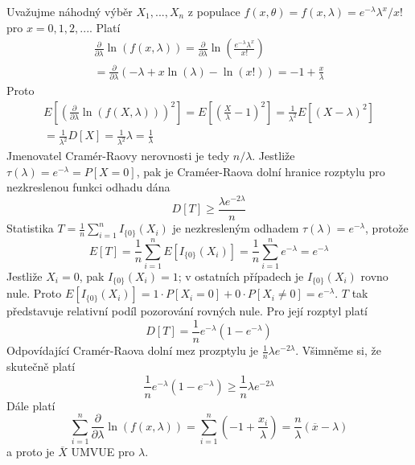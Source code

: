 \begin{example}
Uvažujme náhodný výběr $X_1, ..., X_n$ z populace $f(x, \theta) = f(x, \lambda) = e^{-\lambda}\lambda^x / x!$ pro $x = 0, 1, 2, ...$. Platí
\begin{gather*}
\frac{\partial}{\partial \lambda} \ln \left(f(x, \lambda)\right) = \frac{\partial}{\partial \lambda} \ln \left(\frac{e^{-\lambda}\lambda^x}{x!}\right)\\
= \frac{\partial}{\partial \lambda}(-\lambda + x \ln(\lambda) - \ln(x!)) = -1 + \frac{x}{\lambda} 
\end{gather*}
Proto
\begin{gather*}
E\left[\left(\frac{\partial}{\partial \lambda} \ln\left(f(X, \lambda)\right)\right)^2\right] = E\left[\left(\frac{X}{\lambda} - 1\right)^2\right] = \frac{1}{\lambda^2}E[(X - \lambda)^2]\\
= \frac{1}{\lambda^2}D[X] = \frac{1}{\lambda^2}{\lambda} = \frac{1}{\lambda}
\end{gather*}
Jmenovatel Cramér-Raovy nerovnosti je tedy $n/\lambda$. Jestliže $\tau(\lambda) = e^{-\lambda} = P[X = 0]$, pak je Craméer-Raova dolní hranice rozptylu pro nezkreslenou funkci odhadu dána
\begin{equation*}
D[T] \ge \frac{\lambda e^{-2 \lambda}}{n}
\end{equation*}
Statistika $T = \frac{1}{n}\sum_{i = 1}^n I_{\{0\}}(X_i)$ je nezkresleným odhadem $\tau(\lambda) = e^{-\lambda}$, protože 
\begin{equation*}
E[T] = \frac{1}{n}\sum_{i = 1}^n E[I_{\{0\}}(X_i)] = \frac{1}{n}\sum_{i = 1}^n e^{-\lambda} = e^{-\lambda}
\end{equation*}
Jestliže $X_i = 0$, pak $I_{\{0\}}(X_i) = 1$; v ostatních případech je $I_{\{0\}}(X_i)$ rovno nule. Proto $E[I_{\{0\}}(X_i)] = 1 \cdot P[X_i = 0] + 0 \cdot P[X_i \neq 0] = e^{-\lambda}$. $T$ tak představuje relativní podíl pozorování rovných nule. Pro její rozptyl platí
\begin{equation*}
D[T] = \frac{1}{n}e^{-\lambda}(1 - e^{-\lambda})
\end{equation*}
Odpovídající Cramér-Raova dolní mez prozptylu je $\frac{1}{n}\lambda e^{-2 \lambda}$. Všimněme si, že skutečně platí
\begin{equation*}
\frac{1}{n}e^{-\lambda}(1 - e^{-\lambda}) \ge \frac{1}{n}\lambda e^{-2 \lambda}
\end{equation*}
Dále platí
\begin{equation*}
\sum_{i = 1}^n \frac{\partial}{\partial \lambda} \ln \left(f(x, \lambda)\right) = \sum_{i = 1}^n \left(-1 + \frac{x_i}{\lambda}\right) = \frac{n}{\lambda}(\overline{x} - \lambda)
\end{equation*}
a proto je $\overline{X}$ UMVUE pro $\lambda$.
\end{example}

